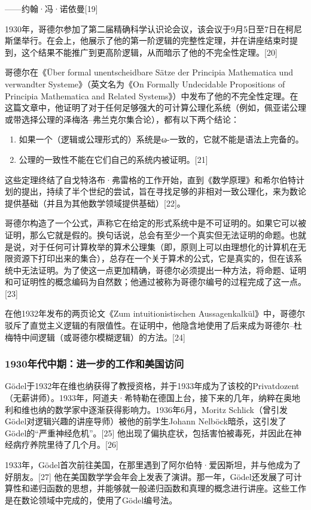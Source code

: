 ——约翰·冯·诺依曼[19]

1930年，哥德尔参加了第二届精确科学认识论会议，该会议于9月5日至7日在柯尼斯堡举行。在会上，他展示了他的第一阶逻辑的完整性定理，并在讲座结束时提到，这个结果不能推广到更高阶逻辑，从而暗示了他的不完全性定理。[20]

哥德尔在《Über formal unentscheidbare Sätze der Principia Mathematica und verwandter Systeme》（英文名为《On Formally Undecidable Propositions of Principia Mathematica and Related Systems》）中发布了他的不完全性定理。在这篇文章中，他证明了对于任何足够强大的可计算公理化系统（例如，佩亚诺公理或带选择公理的泽梅洛–弗兰克尔集合论），都有以下两个结论：
\begin{enumerate}
\item 如果一个（逻辑或公理形式的）系统是ω-一致的，它就不能是语法上完备的。
\item 公理的一致性不能在它们自己的系统内被证明。[21]
\end{enumerate}
这些定理终结了自戈特洛布·弗雷格的工作开始，直到《数学原理》和希尔伯特计划的提出，持续了半个世纪的尝试，旨在寻找足够的非相对一致公理化，来为数论提供基础（并且为其他数学领域提供基础）[22]。

哥德尔构造了一个公式，声称它在给定的形式系统中是不可证明的。如果它可以被证明，那么它就是假的。换句话说，总会有至少一个真实但无法证明的命题。也就是说，对于任何可计算枚举的算术公理集（即，原则上可以由理想化的计算机在无限资源下打印出来的集合），总存在一个关于算术的公式，它是真实的，但在该系统中无法证明。为了使这一点更加精确，哥德尔必须提出一种方法，将命题、证明和可证明性的概念编码为自然数；他通过被称为哥德尔编号的过程完成了这一点。[23]

在他1932年发布的两页论文《Zum intuitionistischen Aussagenkalkül》中，哥德尔驳斥了直觉主义逻辑的有限值性。在证明中，他隐含地使用了后来成为哥德尔–杜梅特中间逻辑（或哥德尔模糊逻辑）的方法。[24]
\subsubsection{1930年代中期：进一步的工作和美国访问}
Gödel于1932年在维也纳获得了教授资格，并于1933年成为了该校的Privatdozent（无薪讲师）。1933年，阿道夫·希特勒在德国上台，接下来的几年，纳粹在奥地利和维也纳的数学家中逐渐获得影响力。1936年6月，Moritz Schlick（曾引发Gödel对逻辑兴趣的讲座导师）被他的前学生Johann Nelböck暗杀，这引发了Gödel的“严重神经危机”。[25] 他出现了偏执症状，包括害怕被毒死，并因此在神经病疗养院里待了几个月。[26]

1933年，Gödel首次前往美国，在那里遇到了阿尔伯特·爱因斯坦，并与他成为了好朋友。[27] 他在美国数学学会年会上发表了演讲。那一年，Gödel还发展了可计算性和递归函数的思想，并能够就一般递归函数和真理的概念进行讲座。这些工作是在数论领域中完成的，使用了Gödel编号法。

